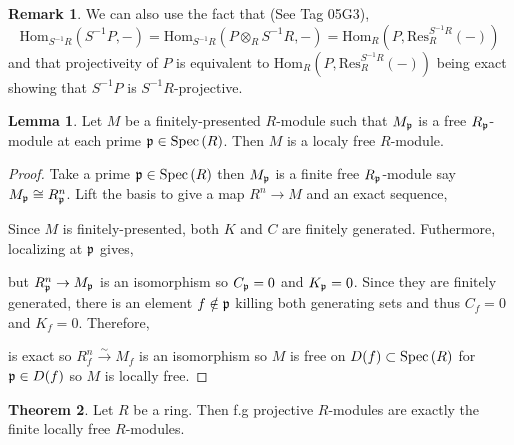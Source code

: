 \documentclass[12pt]{extarticle}
\newcommand{\Hom}[3]{\mathrm{Hom}_{#1}\left( #2, #3 \right)}
\theoremstyle{definition}
\newtheorem{theorem}{Theorem}[section]
\newtheorem{lemma}[theorem]{Lemma}
\newtheorem{remark}{Remark}
\begin{document}
\begin{remark}
We can also use the fact that (See Tag 05G3),
\[ \Hom{S^{-1} R}{S^{-1} P}{-} = \Hom{S^{-1} R}{P \otimes_R S^{-1} R}{-} = \Hom{R}{P}{\mathrm{Res}^{S^{-1} R}_{R} (-)} \]
and that projectiveity of $P$ is equivalent to $\Hom{R}{P}{\mathrm{Res}^{S^{-1} R}_{R} (-)}$ being exact showing that $S^{-1} P$ is $S^{-1} R$-projective.
\end{remark}

\begin{lemma}
Let $M$ be a finitely-presented $R$-module such that $M_{\mathfrak{p}}$ is a free $R_{\mathfrak{p}}$-module at each prime $\mathfrak{p} \in \mathrm{Spec}\left(R\right)$. Then $M$ is a localy free $R$-module.
\end{lemma}

\begin{proof}
Take a prime $\mathfrak{p} \in \mathrm{Spec}\left(R\right)$ then $M_{\mathfrak{p}}$ is a finite free $R_{\mathfrak{p}}$-module say $M_{\mathfrak{p}} \cong R_{\mathfrak{p}}^n$. Lift the basis to give a map $R^n \to M$ and an exact sequence,
\begin{center}
\end{center}
Since $M$ is finitely-presented, both $K$ and $C$ are finitely generated. Futhermore, localizing at $\mathfrak{p}$ gives,
\begin{center}
\end{center}
but $R^n_{\mathfrak{p}} \to M_{\mathfrak{p}}$ is an isomorphism so $C_{\mathfrak{p}} = 0$ and $K_{\mathfrak{p}} = 0$. Since they are finitely generated, there is an element $f \notin \mathfrak{p}$ killing both generating sets and thus $C_f = 0$ and $K_f = 0$. Therefore, 
\begin{center}
\end{center}
is exact so $R^n_f \xrightarrow{\sim} M_f$ is an isomorphism so $M$ is free on $D(f) \subset \mathrm{Spec}\left(R\right)$ for $\mathfrak{p} \in D(f)$ so $M$ is locally free.
\end{proof}

\begin{theorem}
Let $R$ be a ring. Then f.g projective $R$-modules are exactly the finite locally free $R$-modules. 
\end{theorem}
\end{document}

